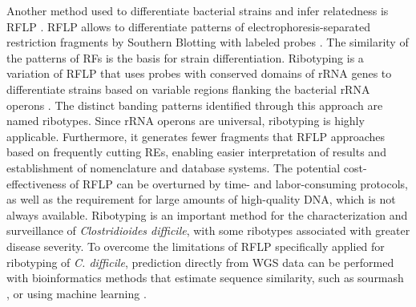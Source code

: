 Another method used to differentiate bacterial strains and infer relatedness is \ac{RFLP} \cite{thibodeau_use_1987, todd_chromosome_2001}. \ac{RFLP} allows to differentiate patterns of electrophoresis-separated restriction fragments by Southern Blotting with labeled probes \cite{southern_detection_1975}. The similarity of the patterns of \ac{RFs} is the basis for strain differentiation. Ribotyping is a variation of \ac{RFLP} that uses probes with conserved domains of \ac{rRNA} genes to differentiate strains based on variable regions flanking the bacterial \ac{rRNA} operons \cite{bingen_use_1994}. The distinct banding patterns identified through this approach are named ribotypes. Since \ac{rRNA} operons are universal, ribotyping is highly applicable. Furthermore, it generates fewer fragments that \ac{RFLP} approaches based on frequently cutting \ac{REs}, enabling easier interpretation of results and establishment of nomenclature and database systems. The potential cost-effectiveness of \ac{RFLP} can be overturned by time- and labor-consuming protocols, as well as the requirement for large amounts of high-quality \ac{DNA}, which is not always available. Ribotyping is an important method for the characterization and surveillance of \textit{Clostridioides difficile}, with some ribotypes associated with greater disease severity. To overcome the limitations of \ac{RFLP} specifically applied for ribotyping of \textit{C. difficile}, prediction directly from \ac{WGS} data can be performed with bioinformatics methods that estimate sequence similarity, such as sourmash \cite{moore_k-mer_2022, irber_sourmash_2024}, or using machine learning \cite{qi_p-224_2025}.


